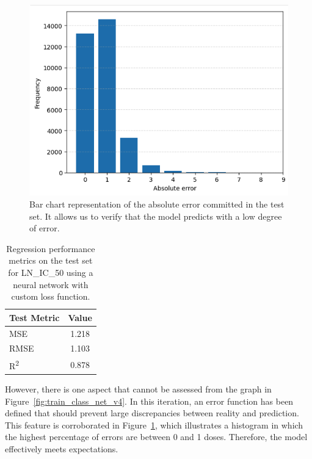 \begin{figure}[H]
    \centering
    \includegraphics[width=1\textwidth]{figures/neural_net_classification/catogorical_net_barplot.png}
    \caption{Bar chart representation of the absolute error committed in the test set. It allows us to verify that the model predicts with a low degree of error.}
    \label{fig:train_class_net_v4_barplot}
\end{figure}

\begin{table}[H]
    \centering
    \begin{tabular}{|l|c|}
    \hline
    \textbf{Test Metric} & \textbf{Value} \\
    \hline
    MSE & 1.218 \\
    RMSE & 1.103 \\
    R\textsuperscript{2} & 0.878 \\
    \hline
    \end{tabular}
    \caption{Regression performance metrics on the test set for LN\_IC\_50 using a neural network with custom loss function.}
    \label{tab:test_regression_metrics:net_class_v4}
\end{table}

However, there is one aspect that cannot be assessed from the graph in Figure~\ref{fig:train_class_net_v4}. In this iteration, an error function has been defined that should prevent large discrepancies between reality and prediction. This feature is corroborated in Figure~\ref{fig:train_class_net_v4_barplot}, which illustrates a histogram in which the highest percentage of errors are between 0 and 1 doses. Therefore, the model effectively meets expectations.

